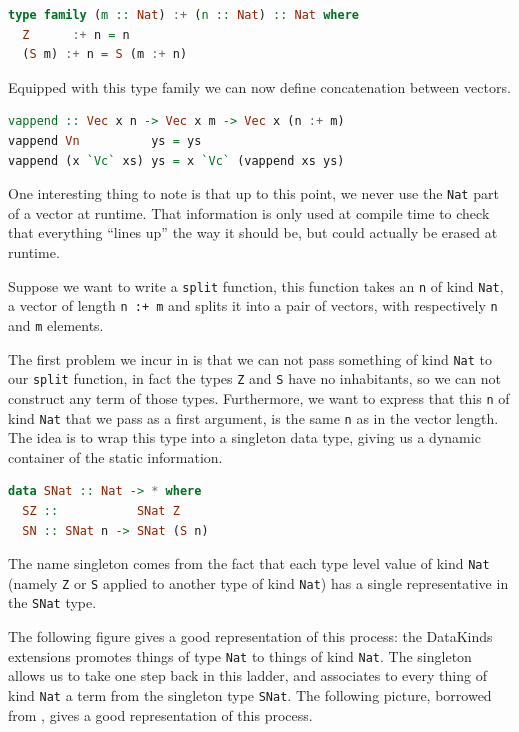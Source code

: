 \documentclass[11pt]{article}
\begin{document}
\begin{lstlisting}[language=haskell]
type family (m :: Nat) :+ (n :: Nat) :: Nat where
  Z      :+ n = n
  (S m) :+ n = S (m :+ n)
\end{lstlisting}

Equipped with this type family we can now define concatenation between
vectors.

\begin{lstlisting}[language=haskell]
vappend :: Vec x n -> Vec x m -> Vec x (n :+ m)
vappend Vn          ys = ys
vappend (x `Vc` xs) ys = x `Vc` (vappend xs ys)
\end{lstlisting}

One interesting thing to note is that up to this point, we never use the
\texttt{Nat} part of a vector at runtime. That information is only used
at compile time to check that everything ``lines up'' the way it should
be, but could actually be erased at runtime.

Suppose we want to write a \texttt{split} function, this function takes
an \texttt{n} of kind \texttt{Nat}, a vector of length \texttt{n\ :+\ m}
and splits it into a pair of vectors, with respectively \texttt{n} and
\texttt{m} elements.

The first problem we incur in is that we can not pass something of kind
\texttt{Nat} to our \texttt{split} function, in fact the types \texttt{Z} and \texttt{S} have no inhabitants, so we can
not construct any term of those types. Furthermore, we want to
express that this \texttt{n} of kind \texttt{Nat} that we pass as a
first argument, is the same \texttt{n} as in the vector length. The idea is to 
wrap this type into a singleton data type, giving us a dynamic container of the static 
information.

\begin{lstlisting}[language=haskell]
data SNat :: Nat -> * where
  SZ ::           SNat Z
  SN :: SNat n -> SNat (S n)
\end{lstlisting}

The name singleton comes from the fact that each type level value of
kind \texttt{Nat} (namely \texttt{Z} or \texttt{S} applied to another
type of kind \texttt{Nat}) has a single representative in the
\texttt{SNat} type.

The following figure gives a good representation of this process: the
DataKinds extensions promotes things of type \texttt{Nat} to things of
kind \texttt{Nat}. The singleton allows us to take one step back in this
ladder, and associates to every thing of kind \texttt{Nat} a term from
the singleton type \texttt{SNat}. The following picture, borrowed from \cite{singletons}, gives a good 
representation of this process.
\end{document}
